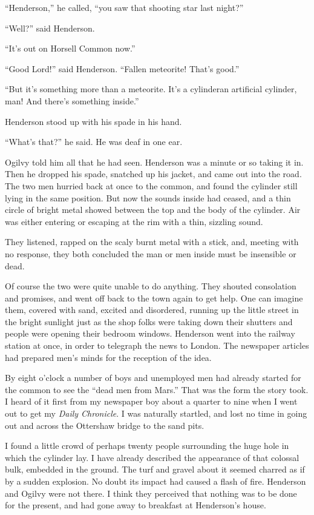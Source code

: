 ``Henderson,'' he called, ``you saw that shooting star last night?''

``Well?'' said Henderson.

``It's out on Horsell Common now.''

``Good Lord!'' said Henderson. ``Fallen meteorite! That's good.''

``But it's something more than a meteorite. It's a cylinder\dash{}an
artificial cylinder, man! And there's something inside.''

Henderson stood up with his spade in his hand.

``What's that?'' he said. He was deaf in one ear.

Ogilvy told him all that he had seen. Henderson was a minute or so
taking it in. Then he dropped his spade, snatched up his jacket,
and came out into the road. The two men hurried back at once to the
common, and found the cylinder still lying in the same position.
But now the sounds inside had ceased, and a thin circle of bright
metal showed between the top and the body of the cylinder. Air was
either entering or escaping at the rim with a thin, sizzling
sound.

They listened, rapped on the scaly burnt metal with a stick, and,
meeting with no response, they both concluded the man or men inside
must be insensible or dead.

Of course the two were quite unable to do anything. They shouted
consolation and promises, and went off back to the town again to
get help. One can imagine them, covered with sand, excited and
disordered, running up the little street in the bright sunlight
just as the shop folks were taking down their shutters and people
were opening their bedroom windows. Henderson went into the railway
station at once, in order to telegraph the news to London. The
newspaper articles had prepared men's minds for the reception of
the idea.

By eight o'clock a number of boys and unemployed men had already
started for the common to see the ``dead men from Mars.'' That was
the form the story took. I heard of it first from my newspaper boy
about a quarter to nine when I went out to get my
\emph{Daily Chronicle}. I was naturally startled, and lost no time
in going out and across the Ottershaw bridge to the sand pits.

I found a little crowd of perhaps twenty people surrounding the
huge hole in which the cylinder lay. I have already described the
appearance of that colossal bulk, embedded in the ground. The turf
and gravel about it seemed charred as if by a sudden explosion. No
doubt its impact had caused a flash of fire. Henderson and Ogilvy
were not there. I think they perceived that nothing was to be done
for the present, and had gone away to breakfast at Henderson's
house.

